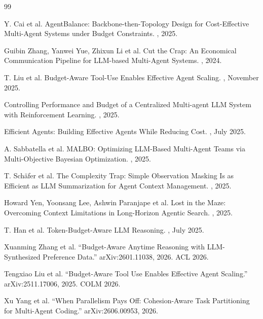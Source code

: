 \documentclass[11pt]{book}
\begin{document}
\begin{thebibliography}{99}

Y. Cai et al.
\newblock AgentBalance: Backbone-then-Topology Design for Cost-Effective Multi-Agent Systems under Budget Constraints.
, 2025.

Guibin Zhang, Yanwei Yue, Zhixun Li et al.
\newblock Cut the Crap: An Economical Communication Pipeline for LLM-based Multi-Agent Systems.
, 2024.

T. Liu et al.
\newblock Budget-Aware Tool-Use Enables Effective Agent Scaling.
, November 2025.

\newblock Controlling Performance and Budget of a Centralized Multi-agent LLM System with Reinforcement Learning.
, 2025.

Efficient Agents: Building Effective Agents While Reducing Cost.
, July 2025.

A. Sabbatella et al.
\newblock MALBO: Optimizing LLM-Based Multi-Agent Teams via Multi-Objective Bayesian Optimization.
, 2025.

T. Sch\"afer et al.
\newblock The Complexity Trap: Simple Observation Masking Is as Efficient as LLM Summarization for Agent Context Management.
, 2025.

Howard Yen, Yoonsang Lee, Ashwin Paranjape et al.
\newblock Lost in the Maze: Overcoming Context Limitations in Long-Horizon Agentic Search.
, 2025.

T. Han et al.
\newblock Token-Budget-Aware LLM Reasoning.
, July 2025.


Xuanming Zhang et al.
``Budget-Aware Anytime Reasoning with LLM-Synthesized Preference Data.''
arXiv:2601.11038, 2026. ACL 2026.

Tengxiao Liu et al.
``Budget-Aware Tool Use Enables Effective Agent Scaling.''
arXiv:2511.17006, 2025. COLM 2026.

Xu Yang et al.
``When Parallelism Pays Off: Cohesion-Aware Task Partitioning for Multi-Agent Coding.''
arXiv:2606.00953, 2026.


\end{thebibliography}
\end{document}
